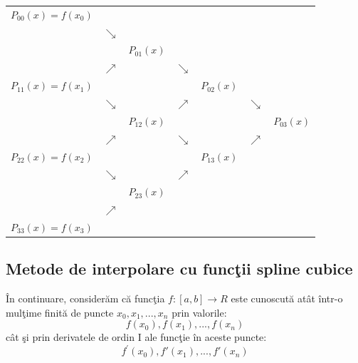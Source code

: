 \documentclass{exam}
\begin{document}
\begin{center}
	\begin{tabular}{ccccccc}
		$P_{00}(x)=f(x_0)$ & {}          & {}                                                                  \\
		{}                 & $\searrow $ & {}          & {}                                                    \\
		{}                 & {}          & $P_{01}(x)$ & {}                                                    \\
		{}                 & $\nearrow $ & {}          & $\searrow $                                           \\
		$P_{11}(x)=f(x_1)$ & {}          & {}          & {}          & $P_{02}(x)$                             \\
		{}                 & $\searrow $ & {}          & $\nearrow $ & {}          & $\searrow $               \\
		{}                 & {}          & $P_{12}(x)$ & {}          & {}          & {}          & $P_{03}(x)$ \\
		{}                 & $\nearrow $ & {}          & $\searrow $ & {}          & $\nearrow$                \\
		$P_{22}(x)=f(x_2)$ & {}          & {}          & {}          & $P_{13}(x)$                             \\
		{}                 & $\searrow $ & {}          & $\nearrow $                                           \\
		{}                 & {}          & $P_{23}(x)$ & {}                                                    \\
		{}                 & $\nearrow $ & {}                                                                  \\
		$P_{33}(x)=f(x_3)$ & {}          & {}          & {}                                                    \\
	\end{tabular}
\end{center}

\subsection{Metode de interpolare cu funcţii spline cubice}

În continuare, considerăm că funcţia $f:[a, b] \rightarrow R$ este cunoscută atât într-o mulţime finită de puncte $x_0,x_1, ...,x_n$ prin valorile: $$f(x_0), f(x_1), ...,f(x_n)$$
cât şi prin derivatele de ordin I ale funcţie în aceste puncte:
$$f^{'}(x_0), f{'}(x_1), ...,f{'}(x_n)$$
\end{document}
